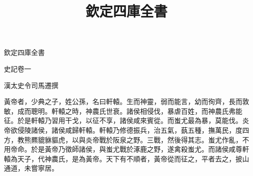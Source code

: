 \documentclass[四库全书]{ltc-guji}
\title{欽定四庫全書}
\begin{document}
\begin{正文}
%
欽定四庫全書

\begin{段落}[indent=1]
史記卷一
\end{段落}

\begin{段落}[indent=7]
漢太史令司馬遷撰
\end{段落}

黃帝者，少典之子，姓公孫，名曰軒轅。生而神靈，弱而能言，幼而徇齊，長而敦敏，成而聰明。軒轅之時，神農氏世衰。諸侯相侵伐，暴虐百姓，而神農氏弗能征。於是軒轅乃習用干戈，以征不享，諸侯咸來賓從。而蚩尤最為暴，莫能伐。炎帝欲侵陵諸侯，諸侯咸歸軒轅。軒轅乃修德振兵，治五氣，蓺五種，撫萬民，度四方，教熊羆貔貅貙虎，以與炎帝戰於阪泉之野。三戰，然後得其志。蚩尤作亂，不用帝命。於是黃帝乃徵師諸侯，與蚩尤戰於涿鹿之野，遂禽殺蚩尤。而諸侯咸尊軒轅為天子，代神農氏，是為黃帝。天下有不順者，黃帝從而征之，平者去之，披山通道，未嘗寧居。
\end{正文}
\end{document}
